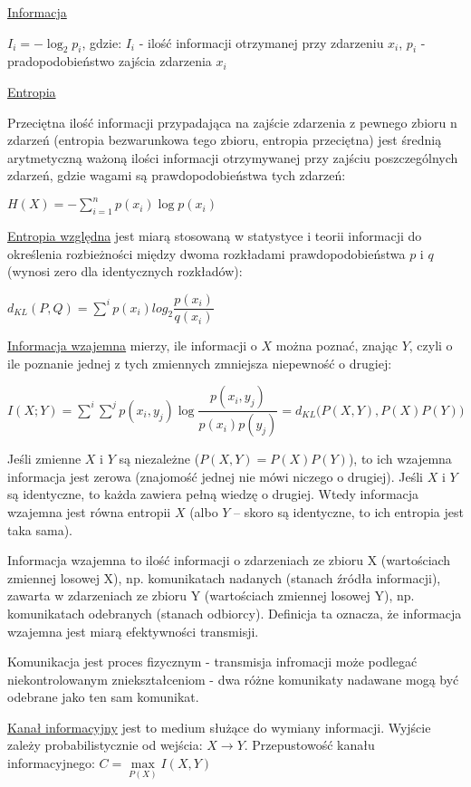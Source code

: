 \underline{Informacja}

$ I_i = -\log_2 p_i $, gdzie:\newline
$ I_i $ - ilość informacji otrzymanej przy zdarzeniu $ x_i $,\newline
$ p_i $ - pradopodobieństwo zajścia zdarzenia $ x_i $

\underline{Entropia}

Przeciętna ilość informacji przypadająca na zajście zdarzenia z pewnego zbioru n zdarzeń (entropia bezwarunkowa tego zbioru, entropia przeciętna) jest średnią arytmetyczną ważoną ilości informacji otrzymywanej przy zajściu poszczególnych zdarzeń, gdzie wagami są prawdopodobieństwa tych zdarzeń:

$ H(X) = -\sum\limits_{i=1}^n p(x_i)\log p(x_i) $

\underline{Entropia względna} jest miarą stosowaną w statystyce i teorii informacji do określenia rozbieżności między dwoma rozkładami prawdopodobieństwa $ p $ i $ q $ (wynosi zero dla identycznych rozkładów):

$ d_{KL}(P, Q) = \sum\limits^i p(x_i) log_2 \dfrac{p(x_i)}{q(x_i)} $

\underline{Informacja wzajemna} mierzy, ile informacji o $ X $ można poznać, znając $ Y $, czyli o ile poznanie jednej z tych zmiennych zmniejsza niepewność o drugiej:

$ I(X;Y) = \sum\limits^i \sum\limits^j p(x_i, y_j) \log \dfrac{p(x_i, y_j)}{p(x_i)p(y_j)} = d_{KL}\big(P(X, Y), P(X)P(Y)\big) $

Jeśli zmienne $ X $ i $ Y $ są niezależne ($ P(X,Y) = P(X)P(Y) $), to ich wzajemna informacja jest zerowa (znajomość jednej nie mówi niczego o drugiej). Jeśli $ X $ i $ Y $ są identyczne, to każda zawiera pełną wiedzę o drugiej. Wtedy informacja wzajemna jest równa entropii $ X $ (albo $ Y $ – skoro są identyczne, to ich entropia jest taka sama).

Informacja wzajemna to ilość informacji o zdarzeniach ze zbioru X (wartościach zmiennej losowej X), np. komunikatach nadanych (stanach źródła informacji), zawarta w zdarzeniach ze zbioru Y (wartościach zmiennej losowej Y), np. komunikatach odebranych (stanach odbiorcy). Definicja ta oznacza, że informacja wzajemna jest miarą efektywności transmisji.

Komunikacja jest proces fizycznym - transmisja infromacji może podlegać niekontrolowanym zniekształceniom - dwa różne komunikaty nadawane mogą być odebrane jako ten sam komunikat.

\underline{Kanał informacyjny} jest to medium służące do wymiany informacji. Wyjście zależy probabilistycznie od wejścia: $ X \rightarrow Y $. Przepustowość kanału informacyjnego: \newline
$ C = \max\limits_{P(X)} I(X, Y) $

